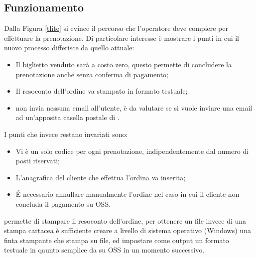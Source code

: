 \subsection{Funzionamento \tlite}\label{progettazionetlite}
Dalla Figura \ref{tlite} si evince il percorso che l'operatore deve compiere per effettuare la prenotazione. Di particolare interesse è mostrare i punti in cui il nuovo processo differisce da quello attuale:
\begin{itemize}
\item Il biglietto venduto sarà a costo zero, questo permette di concludere la prenotazione anche senza conferma di pagamento;
\item Il resoconto dell'ordine va stampato in formato testuale;
\item \tlite non invia nessuna email all'utente, è da valutare se si vuole inviare una email ad un'apposita casella postale di \net.
\end{itemize}
I punti che invece restano invariati sono:
\begin{itemize}
\item Vi è un solo codice \tlite per ogni prenotazione, indipendentemente dal numero di posti riservati;
\item L'anagrafica del cliente che effettua l'ordina va inserita;
\item \'E necessario annullare manualmente l'ordine nel caso in cui il cliente non concluda il pagamento su OSS.
\end{itemize}

\tlite permette di stampare il resoconto dell'ordine, per ottenere un file invece di una stampa cartacea è sufficiente creare a livello di sistema operativo (Windows) una finta stampante che stampa su file, ed impostare come output un formato testuale in qaunto semplice da  su OSS in un momento successivo.

